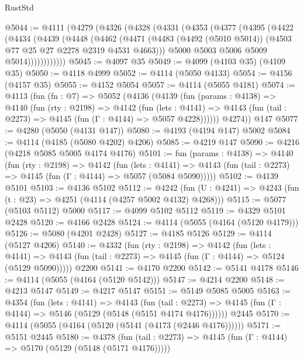 \begin{lexlean}{RustStd}
\begin{coremodule}
@5044 := @4111
    (@4279
      (@4326
        (@4328
          (@4331
            (@4353
              (@4377
                (@4395
                  (@4422
                    (@4434
                      (@4439
                        (@4448
                          (@4462
                            (@4471
                              (@4483
                                (@4492 (@5010 @5014))
                                (@4503 @77 @25 @27 @2278 @2319 @4531 @4663)))
                            @5000
                            @5003
                            @5006
                            @5009
                            @5014))))))))))))
@5045 := @4097 @35
@5049 := @4099 (@4103 @35) (@4109 @35)
@5050 := @4118 @4999
@5052 := @4114 (@5050 @4133)
@5054 := @4156 (@4157 @35)
@5055 := @4152 @5054
@5057 := @4114 (@5055 @4181)
@5074 := @4113
    (fun (fn : @7) =>
    @5052
      (@4136
        (@4139
          (fun (params : @4138) =>
          @4140
            (fun (rty : @2198) =>
            @4142
              (fun (lets : @4141) =>
              @4143 (fun (tail : @2273) => @4145 (fun (Γ : @4144) => @5057 @4228))))))
        @4274))
    @147
@5077 := @4280 (@5050 (@4131 @147))
@5080 := @4193 (@4194 @147) @5002
@5084 := @4114 (@4185 (@5080 @4202) @4206)
@5085 := @4219 @147
@5090 := @4216 (@4218 @5085 @5005 @4174 @4176)
@5101 := fun (params : @4138) =>
  @4140
    (fun (rty : @2198) =>
    @4142
      (fun (lets : @4141) =>
      @4143 (fun (tail : @2273) => @4145 (fun (Γ : @4144) => @5057 (@5084 @5090)))))
@5102 := @4139 @5101
@5103 := @4136 @5102
@5112 := @4242 (fun (U : @4241) => @4243 (fun (t : @23) => @4251 (@4114 (@4257 @5002 @4132) @4268)))
@5115 := @5077 (@5103 @5112) @5000
@5117 := @4099 @5102 @5112
@5119 := @4329 @5101 @2428
@5120 := @4166 @2428
@5124 := @4114 (@5055 (@4164 (@5120 @4179)))
@5126 := @5080 (@4201 @2428)
@5127 := @4185 @5126
@5129 := @4114 (@5127 @4206)
@5140 := @4332
    (fun (rty : @2198) =>
    @4142
      (fun (lets : @4141) =>
      @4143 (fun (tail : @2273) => @4145 (fun (Γ : @4144) => @5124 (@5129 @5090)))))
    @2200
@5141 := @4170 @2200
@5142 := @5141 @4178
@5146 := @4114 (@5055 (@4164 (@5120 @5142)))
@5147 := @4214 @2200
@5148 := @4213 @5147
@5149 := @4217 @5147
@5151 := @5149 @5085 @5005
@5163 := @4354
    (fun (lets : @4141) =>
    @4143
      (fun (tail : @2273) => @4145 (fun (Γ : @4144) => @5146 (@5129 (@5148 (@5151 @4174 @4176))))))
    @2445
@5170 := @4114 (@5055 (@4164 (@5120 (@5141 (@4173 (@2446 @4176))))))
@5171 := @5151 @2445
@5180 := @4378
    (fun (tail : @2273) => @4145 (fun (Γ : @4144) => @5170 (@5129 (@5148 (@5171 @4176)))))

\end{coremodule}
\end{lexlean}
